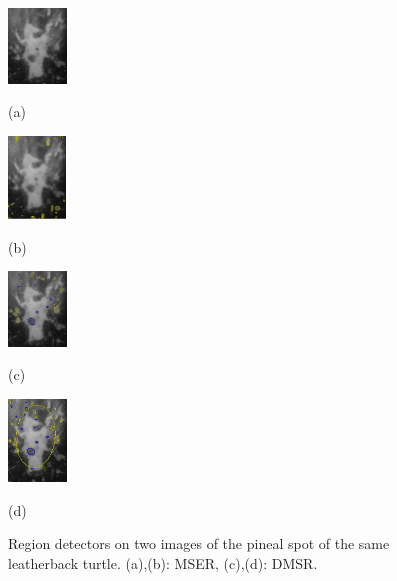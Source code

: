 \documentclass{article}
\begin{document}
\begin{figure}[htb]

\begin{minipage}[b]{.24\linewidth}
  \centering
  \centerline{\includegraphics[height=2.0cm]{./Figs/mserLeatherbackA}}
  \vspace{-0.1cm}
   \centerline{(a)}\medskip
\end{minipage}
\hfill
\begin{minipage}[b]{0.24\linewidth}
  \centering
  \centerline{\includegraphics[height=2.2cm]{./Figs/mserLeatherbackB}}
  \vspace{-0.1cm}
\centerline{(b)}\medskip
\end{minipage}
\hfill
\begin{minipage}[b]{.24\linewidth}
  \centering
  \centerline{\includegraphics[height=2.0cm]{./Figs/dmsrLeatherbackA}}
  \vspace{-0.1cm}
\centerline{(c)}\medskip
\end{minipage}
\hfill
\begin{minipage}[b]{0.24\linewidth}
  \centering
  \centerline{\includegraphics[height=2.2cm]{./Figs/dmsrLeatherbackB}}
  \vspace{-0.1cm}
 \centerline{(d)}\medskip
\end{minipage}

 \vspace{-0.5cm} 
\caption{Region detectors on two images of the pineal spot of the same leatherback turtle.
(a),(b): MSER, (c),(d): DMSR. }
\label{fig:turtle}
%
\end{figure}
\end{document}
